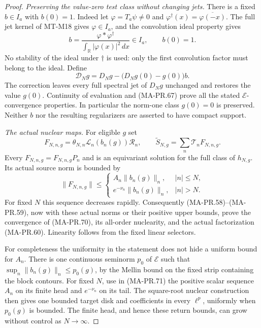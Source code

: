 \begin{proof}
\emph{Preserving the value-zero test class without changing jets.}
There is a fixed \(b\in I_a\) with \(b(0)=1\).
Indeed let \(\varphi=T_a\psi\ne0\) and
\(\varphi^\dagger(x)=\overline{\varphi(-x)}\).
The full jet kernel of MT-M18 gives
\(\varphi\in I_a\), and the convolution ideal property gives
\[
          b=\frac{\varphi*\varphi^\dagger}
                         {\int_{\mathbb R}|\varphi(x)|^2\,dx}
                   \in I_a,\qquad b(0)=1 .
 \tag{MA-PR.68}
\]
No stability of the ideal under \(\dagger\) is used:
only the first convolution factor must belong to the ideal.
Define
\[
       \mathcal D_Ng
            =D_Ng-\bigl(D_Ng(0)-g(0)\bigr)b .
 \tag{MA-PR.69}
\]
The correction leaves every full spectral jet of \(D_Ng\)
unchanged and restores the value \(g(0)\).
Continuity of evaluation and (MA-PR.67) prove all the
stated \(\mathcal E\)-convergence properties.
In particular the norm-one class \(g(0)=0\) is preserved.
Neither \(b\) nor the resulting regularizers are asserted
to have compact support.

\emph{The actual nuclear maps.}
For eligible \(g\) set
\[
 F_{N,n,g}=\theta_{N,n}\mathcal L_n(b_n(g))\mathscr R_n,
 \qquad
 \widetilde S_{N,g}
       =\sum_n\mathcal T_nF_{N,n,g}.
 \tag{MA-PR.70}
\]
Every \(F_{N,n,g}=F_{N,n,g}P_n\) and is an equivariant
solution for the full class of \(h_{N,g}\).
Its actual source norm is bounded by
\[
 \|F_{N,n,g}\|
   \le
   \begin{cases}
       A_n\|b_n(g)\|_n,& |n|\le N,\\
       e^{-\nu_n}\|b_n(g)\|_n,& |n|>N .
   \end{cases}
 \tag{MA-PR.71}
\]
For fixed \(N\) this sequence decreases rapidly.
Consequently (MA-PR.58)--(MA-PR.59), now with these
actual norms or their positive upper bounds, prove
the convergence of (MA-PR.70), its all-order nuclearity,
and the actual factorization (MA-PR.60).
Linearity follows from the fixed linear selectors.

For completeness the uniformity in the statement
does not hide a uniform bound for \(A_n\).
There is one continuous seminorm \(p_0\) of
\(\mathcal E\) such that
\(\sup_n\|b_n(g)\|_n\le p_0(g)\), by the Mellin
bound on the fixed strip containing the block contours.
For fixed \(N\), use in (MA-PR.71) the positive scalar
sequence \(A_n\) on its finite head and \(e^{-\nu_n}\)
on its tail.  The square-root nuclear construction
then gives one bounded target disk and coefficients
in every \(\ell^p\), uniformly when \(p_0(g)\) is bounded.
The finite head, and hence these return bounds,
can grow without control as \(N\to\infty\).


\end{proof}
